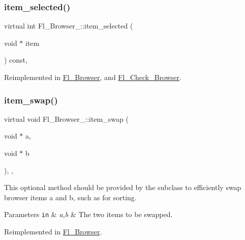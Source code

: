 \subsubsection{\texorpdfstring{item\+\_\+selected()}{item\_selected()}}
{\footnotesize\ttfamily virtual int Fl\+\_\+\+Browser\+\_\+\+::item\+\_\+selected (\begin{DoxyParamCaption}\item[{void $\ast$}]{item }\end{DoxyParamCaption}) const\hspace{0.3cm}{\ttfamily [protected]}, {\ttfamily [virtual]}}



Reimplemented in \hyperlink{class_fl___browser_af407fce6bdc3c2892aad6a38ef647f9e}{Fl\+\_\+\+Browser}, and \hyperlink{class_fl___check___browser_a972578f45f53734d31934b38ec82aec6}{Fl\+\_\+\+Check\+\_\+\+Browser}.

\mbox{\label{class_fl___browser___a52451c9082450cfb259e9e5b06344387}} 
\subsubsection{\texorpdfstring{item\+\_\+swap()}{item\_swap()}}
{\footnotesize\ttfamily virtual void Fl\+\_\+\+Browser\+\_\+\+::item\+\_\+swap (\begin{DoxyParamCaption}\item[{void $\ast$}]{a,  }\item[{void $\ast$}]{b }\end{DoxyParamCaption})\hspace{0.3cm}{\ttfamily [inline]}, {\ttfamily [protected]}, {\ttfamily [virtual]}}

This optional method should be provided by the subclass to efficiently swap browser items {\ttfamily a} and {\ttfamily b}, such as for sorting. 
\begin{DoxyParams}[1]{Parameters}
\mbox{\tt in}  & {\em a,b} & The two items to be swapped. \\
\hline
\end{DoxyParams}


Reimplemented in \hyperlink{class_fl___browser_aca1943ac78a9dfeee8f76d300dbb398c}{Fl\+\_\+\+Browser}.

\mbox{\label{class_fl___browser___afe9e25c3ea0c73dcba379e7a46efaddb}} 
